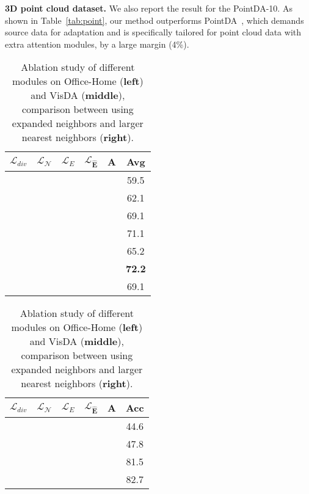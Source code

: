 \documentclass{article}
\newcommand{\cmark}{\ding{51}}\newcommand{\xmark}{\ding{55}}
\begin{document}
\noindent \textbf{3D point cloud dataset.} We also report the result for the PointDA-10. As shown in Table~\ref{tab:point}, our method outperforms  PointDA~\cite{qin2019pointdan}, which demands source data for adaptation and is specifically tailored for point cloud data with extra attention modules, by a large margin (4\%).


\begin{table}[b]
\caption{Ablation study of different modules on Office-Home (\textbf{left}) and VisDA (\textbf{middle}), comparison between using expanded neighbors and larger nearest neighbors (\textbf{right}).}\label{tab:Ablation}
\begin{minipage}[tbp]{0.35\textwidth}
\makeatletter 
\setlength{\tabcolsep}{1.mm}
\begin{tabular}{ccccc|c}
					\hline
					$\mathcal{L}_{div}$&$\mathcal{L}_{\mathcal{N}}$&$\mathcal{L}_E$&$\mathcal{L}_{\bm{\hat{E}}}$&A& \multicolumn{1}{|c}{Avg} \\
					\hline
					& & & && \multicolumn{1}{|c}{59.5}\\
					\bm{\cmark}& & && & \multicolumn{1}{|c}{62.1}\\
					\bm{\cmark}&\bm{\cmark}& && & \multicolumn{1}{|c}{69.1}\\
					\bm{\cmark}&\bm{\cmark}&  &&\bm{\cmark}  &\multicolumn{1}{|c}{71.1}\\
					\bm{\cmark}&\bm{\cmark}& \bm{\cmark}&   &&  \multicolumn{1}{|c}{65.2}\\
					\bm{\cmark}&\bm{\cmark}& \bm{\cmark} && \bm{\cmark}& \multicolumn{1}{|c}{\textbf{72.2}}\\
					\bm{\cmark}&\bm{\cmark}&  &\bm{\cmark}& \bm{\cmark}& \multicolumn{1}{|c}{{69.1}}\\
					\hline
		\end{tabular}
\end{minipage}
	\begin{minipage}[tbp]{0.35\textwidth}
	\makeatletter 
\setlength{\tabcolsep}{1.mm}
\begin{tabular}{ccccc|c}
					\hline
					$\mathcal{L}_{div}$&$\mathcal{L}_{\mathcal{N}}$&$\mathcal{L}_E$&$\mathcal{L}_{\bm{\hat{E}}}$&A& \multicolumn{1}{|c}{Acc} \\
					\hline
					&& & && \multicolumn{1}{|c}{44.6}\\
					\bm{\cmark}&& &  &&\multicolumn{1}{|c}{47.8}\\
					\bm{\cmark}&\bm{\cmark}&  &&  &\multicolumn{1}{|c}{81.5}\\
					\bm{\cmark}&\bm{\cmark}&  &&\bm{\cmark} &\multicolumn{1}{|c}{82.7}\\

\end{tabular}
\end{minipage}
\end{table}
\end{document}

